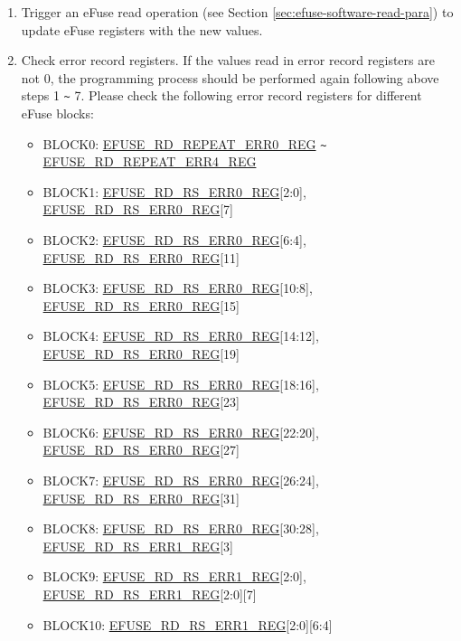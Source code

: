 \documentclass[main\_\_EN.tex]{subfiles}
\begin{document}
\begin{enumerate}
\item Trigger an eFuse read operation (see Section \ref{sec:efuse-software-read-para}) to update eFuse registers with the new values.
\item Check error record registers. If the values read in error record registers are not 0, the programming process should be performed again following above steps 1 \verb+~+ 7. Please check the following error record registers for different eFuse blocks:
\begin{itemize}
    \item BLOCK0: \hyperref[regdesc:EFUSERDREPEATERR0REG]{EFUSE\_RD\_REPEAT\_ERR0\_REG} \verb+~+ \hyperref[regdesc:EFUSERDREPEATERR4REG]{EFUSE\_RD\_REPEAT\_ERR4\_REG}
    \item BLOCK1: \hyperref[regdesc:EFUSERDRSERR0REG]{EFUSE\_RD\_RS\_ERR0\_REG}[2:0], \hyperref[regdesc:EFUSERDRSERR0REG]{EFUSE\_RD\_RS\_ERR0\_REG}[7]
    \item BLOCK2: \hyperref[regdesc:EFUSERDRSERR0REG]{EFUSE\_RD\_RS\_ERR0\_REG}[6:4], \hyperref[regdesc:EFUSERDRSERR0REG]{EFUSE\_RD\_RS\_ERR0\_REG}[11]
    \item BLOCK3: \hyperref[regdesc:EFUSERDRSERR0REG]{EFUSE\_RD\_RS\_ERR0\_REG}[10:8], \hyperref[regdesc:EFUSERDRSERR0REG]{EFUSE\_RD\_RS\_ERR0\_REG}[15]
    \item BLOCK4: \hyperref[regdesc:EFUSERDRSERR0REG]{EFUSE\_RD\_RS\_ERR0\_REG}[14:12], \hyperref[regdesc:EFUSERDRSERR0REG]{EFUSE\_RD\_RS\_ERR0\_REG}[19]
    \item BLOCK5: \hyperref[regdesc:EFUSERDRSERR0REG]{EFUSE\_RD\_RS\_ERR0\_REG}[18:16], \hyperref[regdesc:EFUSERDRSERR0REG]{EFUSE\_RD\_RS\_ERR0\_REG}[23]
    \item BLOCK6: \hyperref[regdesc:EFUSERDRSERR0REG]{EFUSE\_RD\_RS\_ERR0\_REG}[22:20], \hyperref[regdesc:EFUSERDRSERR0REG]{EFUSE\_RD\_RS\_ERR0\_REG}[27]
    \item BLOCK7: \hyperref[regdesc:EFUSERDRSERR0REG]{EFUSE\_RD\_RS\_ERR0\_REG}[26:24], \hyperref[regdesc:EFUSERDRSERR0REG]{EFUSE\_RD\_RS\_ERR0\_REG}[31]
    \item BLOCK8: \hyperref[regdesc:EFUSERDRSERR0REG]{EFUSE\_RD\_RS\_ERR0\_REG}[30:28], \hyperref[regdesc:EFUSERDRSERR1REG]{EFUSE\_RD\_RS\_ERR1\_REG}[3]
    \item BLOCK9: \hyperref[regdesc:EFUSERDRSERR1REG]{EFUSE\_RD\_RS\_ERR1\_REG}[2:0], \hyperref[regdesc:EFUSERDRSERR1REG]{EFUSE\_RD\_RS\_ERR1\_REG}[2:0][7]
    \item BLOCK10: \hyperref[regdesc:EFUSERDRSERR1REG]{EFUSE\_RD\_RS\_ERR1\_REG}[2:0][6:4]
\end{itemize}
\end{enumerate}
\end{document}
